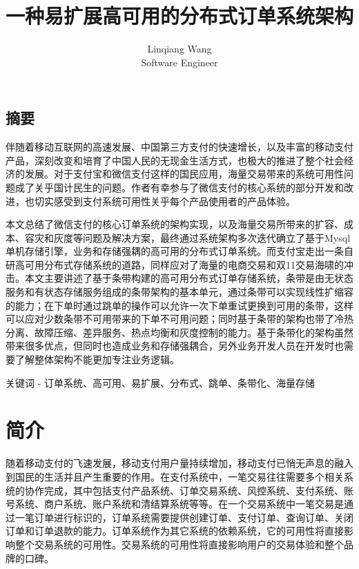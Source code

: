 \documentclass[letterpaper,twocolumn,10pt]{article}
\begin{document}
\date{}

\title{\Large \bf 一种易扩展高可用的分布式订单系统架构}

\author{
{\rm Linqiang Wang}\\
Software Engineer
}

\maketitle

\thispagestyle{empty}


\subsection*{摘要}
伴随着移动互联网的高速发展、中国第三方支付的快速增长，以及丰富的移动支付产品，深刻改变和培育了中国人民的无现金生活方式，也极大的推进了整个社会经济的发展。对于支付宝和微信支付这样的国民应用，海量交易带来的系统可用性问题成了关乎国计民生的问题。作者有幸参与了微信支付的核心系统的部分开发和改进，也切实感受到支付系统可用性关乎每个产品使用者的产品体验。

本文总结了微信支付的核心订单系统的架构实现，以及海量交易所带来的扩容、成本、容灾和灰度等问题及解决方案，最终通过系统架构多次迭代确立了基于Mysql单机存储引擎，业务和存储强耦的高可用的分布式订单系统。而支付宝走出一条自研高可用分布式存储系统的道路，同样应对了海量的电商交易和双11交易海啸的冲击。本文主要讲述了基于条带构建的高可用分布式订单存储系统，条带是由无状态服务和有状态存储服务组成的条带架构的基本单元，通过条带可以实现线性扩缩容的能力；在下单时通过跳单的操作可以允许一次下单重试更换到可用的条带，这样可以应对少数条带不可用带来的下单不可用问题；同时基于条带的架构也带了冷热分离、故障压缩、差异服务、热点均衡和灰度控制的能力。基于条带化的架构虽然带来很多优点，但同时也造成业务和存储强耦合，另外业务开发人员在开发时也需要了解整体架构不能更加专注业务逻辑。

关键词 - 订单系统、高可用、易扩展、分布式、跳单、条带化、海量存储
\section{简介}
随着移动支付的飞速发展，移动支付用户量持续增加，移动支付已悄无声息的融入到国民的生活并且产生重要的作用。在支付系统中，一笔交易往往需要多个相关系统的协作完成，其中包括支付产品系统、订单交易系统、风控系统、支付系统、账号系统、商户系统、账户系统和清结算系统等等。在一个交易系统中一笔交易是通过一笔订单进行标识的，订单系统需要提供创建订单、支付订单、查询订单、关闭订单和订单退款的能力。订单系统作为其它系统的依赖系统，它的可用性将直接影响整个交易系统的可用性。交易系统的可用性将直接影响用户的交易体验和整个品牌的口碑。
\end{document}
